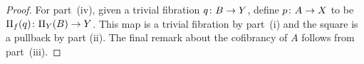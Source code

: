 \documentclass[reqno,10pt,a4paper,oneside,draft]{amsart}
\begin{document}
\begin{proof}

For part~(iv), given a trivial fibration $q \colon B \to Y$, define $p \colon A \to X$ to  be $\Pi_f(q) \colon \Pi_Y(B) \to Y$. This map is a trivial fibration by part~(i) and the square is a pullback by part (ii). The final remark about the cofibrancy of $A$ follows from part~(iii). \qedhere
\end{proof}
\end{document}
